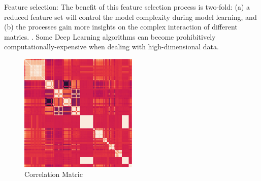 \documentclass[5p]{elsarticle}
\begin{document}
Feature selection: The benefit of this feature selection process is two-fold: (a) a reduced feature set will control the model complexity during model learning, and (b) the processes gain more insights on the complex interaction of different matrics. \cite{Yeom2016Data-DrivenMatrices}. Some Deep Learning algorithms can become prohibitively computationally-expensive when dealing with high-dimensional data. 



\begin{figure}[h]
    \centering
    \includegraphics[width=0.5\textwidth]{Correlation_Matric.png}
    \caption{Correlation Matric}
    \label{fig:Correlation Matric}
\end{figure}
\end{document}
